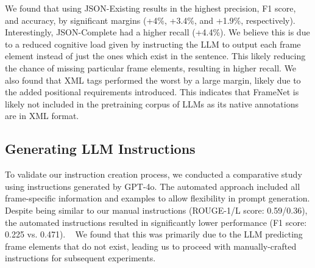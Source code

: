 We found that using JSON-Existing results in the highest precision, F1 score, and accuracy, by significant margins (+4\%, +3.4\%, and +1.9\%, respectively). Interestingly, JSON-Complete had a higher recall (+4.4\%). We believe this is due to a reduced cognitive load given by instructing the LLM to output each frame element instead of just the ones which exist in the sentence. This likely reducing the chance of missing particular frame elements, resulting in higher recall. We also found that XML tags performed the worst by a large margin, likely due to the added positional requirements introduced. This indicates that FrameNet is likely not included in the pretraining corpus of LLMs as its native annotations are in XML format. 

\subsection{Generating LLM Instructions}
To validate our instruction creation process, we conducted a comparative study using instructions generated by GPT-4o. The automated approach included all frame-specific information and examples to allow flexibility in prompt generation. Despite being similar to our manual instructions (ROUGE-1/L score: 0.59/0.36), the automated instructions resulted in significantly lower performance (F1 score: 0.225 vs. 0.471). ~ We found that this was primarily due to the LLM predicting frame elements that do not exist, leading us to proceed with manually-crafted instructions for subsequent experiments. 

